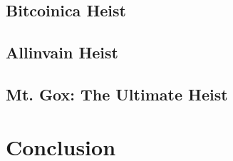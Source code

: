 \documentclass{report}
\begin{document}
\subsection*{Bitcoinica Heist}

\subsection*{Allinvain Heist}
\subsection*{Mt. Gox: The Ultimate Heist}

\section*{Conclusion}

{}

\end{document}
